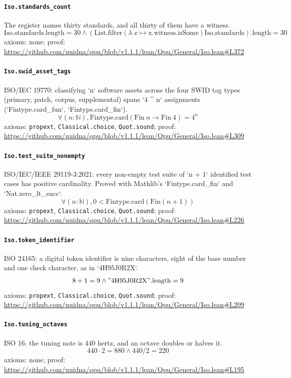\documentclass[11pt]{article}
\begin{document}
\paragraph{\texttt{Iso.standards\_count}}
The register names thirty standards, and all thirty of them have a witness.
\[ \mathrm{Iso.standards.length} = 30 \land (\mathrm{List.filter} (\lambda \ x \mapsto \mathrm{x.witness.isSome}) \mathrm{Iso.standards})\mathrm{.length} = 30 \]
\noindent axioms: none; proof: \url{https://github.com/uuidna/qpu/blob/v1.1.1/lean/Qpu/General/Iso.lean\#L372}

\paragraph{\texttt{Iso.swid\_asset\_tags}}
ISO/IEC 19770: classifying `n` software assets across the four SWID tag types (primary, patch, corpus, supplemental) spans `4 \^{} n` assignments (`Fintype.card\_fun`, `Fintype.card\_fin`).
\[ \forall (n : \mathbb{N}), \mathrm{Fintype.card} (\mathrm{Fin}\ n \to \mathrm{Fin}\ 4) = 4 ^{n} \]
\noindent axioms: \texttt{propext}, \texttt{Classical.choice}, \texttt{Quot.sound}; proof: \url{https://github.com/uuidna/qpu/blob/v1.1.1/lean/Qpu/General/Iso.lean\#L309}

\paragraph{\texttt{Iso.test\_suite\_nonempty}}
ISO/IEC/IEEE 29119-3:2021: every non-empty test suite of `n + 1` identified test cases has positive cardinality. Proved with Mathlib's `Fintype.card\_fin` and `Nat.zero\_lt\_succ`.
\[ \forall (n : \mathbb{N}), 0 < \mathrm{Fintype.card} (\mathrm{Fin} (n + 1)) \]
\noindent axioms: \texttt{propext}, \texttt{Classical.choice}, \texttt{Quot.sound}; proof: \url{https://github.com/uuidna/qpu/blob/v1.1.1/lean/Qpu/General/Iso.lean\#L226}

\paragraph{\texttt{Iso.token\_identifier}}
ISO 24165: a digital token identifier is nine characters, eight of the base number and one check character, as in `4H95J0R2X`.
\[ 8 + 1 = 9 \land "\mathrm{4H95J0R2X}"\mathrm{.length} = 9 \]
\noindent axioms: \texttt{propext}, \texttt{Classical.choice}, \texttt{Quot.sound}; proof: \url{https://github.com/uuidna/qpu/blob/v1.1.1/lean/Qpu/General/Iso.lean\#L209}

\paragraph{\texttt{Iso.tuning\_octaves}}
ISO 16: the tuning note is 440 hertz, and an octave doubles or halves it.
\[ 440 \cdot 2 = 880 \land 440 / 2 = 220 \]
\noindent axioms: none; proof: \url{https://github.com/uuidna/qpu/blob/v1.1.1/lean/Qpu/General/Iso.lean\#L195}
\end{document}
